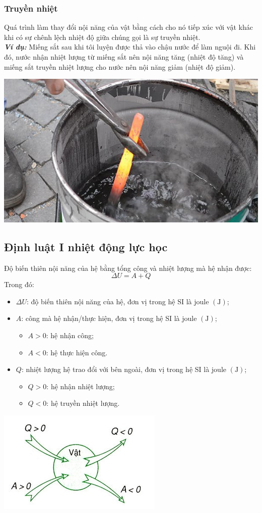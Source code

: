 \subsubsection{Truyền nhiệt}
Quá trình làm thay đổi nội năng của vật bằng cách cho nó tiếp xúc với vật khác khi có sự chênh lệch nhiệt độ giữa chúng gọi là sự truyền nhiệt.\\
\textbf{\textit{Ví dụ:}} Miếng sắt sau khi tôi luyện được thả vào chậu nước để làm nguội đi. Khi đó, nước nhận nhiệt lượng từ miếng sắt nên nội năng tăng (nhiệt độ tăng) và miếng sắt truyền nhiệt lượng cho nước nên nội năng giảm (nhiệt độ giảm).
\begin{center}
	\includegraphics[width=0.3\linewidth]{../figs/VN12-Y24-PH-SYL-003-2}
\end{center}
\subsection{Định luật I nhiệt động lực học}
Độ biến thiên nội năng của hệ bằng tổng công và nhiệt lượng mà hệ nhận được:
\begin{equation}
	\Delta U= A+Q
\end{equation}
Trong đó:
\begin{itemize}
	\item $\Delta U$: độ biến thiên nội năng của hệ, đơn vị trong hệ SI là joule $\left(\si{\joule}\right)$;
	\item $A$: công mà hệ nhận/thực hiện, đơn vị trong hệ SI là joule $\left(\si{\joule}\right)$;
	\begin{itemize}[label=+]
		\item $A>0$: hệ nhận công;
		\item $A<0$: hệ thực hiện công.
	\end{itemize}
	\item $Q$: nhiệt lượng hệ trao đổi với bên ngoài, đơn vị trong hệ SI là joule $\left(\si{\joule}\right)$;
	\begin{itemize}[label=+]
		\item $Q>0$: hệ nhận nhiệt lượng;
		\item $Q<0$: hệ truyền nhiệt lượng.
	\end{itemize}
\end{itemize}
\begin{center}
	\includegraphics[width=0.35\linewidth]{../figs/VN12-Y24-PH-SYL-003-3}
\end{center}
